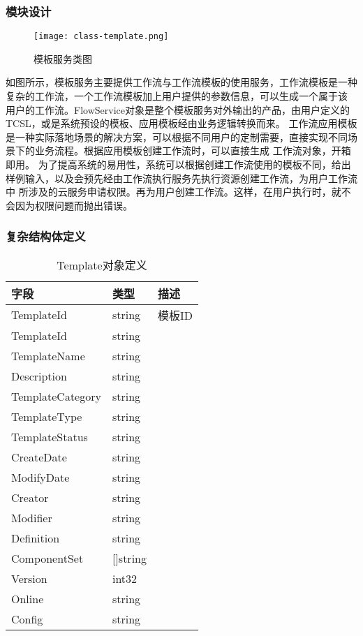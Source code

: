 \subsubsection{模块设计}



\begin{figure}[H]
    \centering
    \texttt{[image: class-template.png]}
    \caption{模板服务类图}
    \label{fig:模板服务类图}
\end{figure}
如图所示，模板服务主要提供工作流与工作流模板的使用服务，工作流模板是一种复杂的工作流，一个工作流模板加上用户提供的参数信息，可以生成一个属于该
用户的工作流。FlowService对象是整个模板服务对外输出的产品，由用户定义的TCSL，或是系统预设的模板、应用模板经由业务逻辑转换而来。
工作流应用模板是一种实际落地场景的解决方案，可以根据不同用户的定制需要，直接实现不同场景下的业务流程。根据应用模板创建工作流时，可以直接生成
工作流对象，开箱即用。
为了提高系统的易用性，系统可以根据创建工作流使用的模板不同，给出样例输入，以及会预先经由工作流执行服务先执行资源创建工作流，为用户工作流中
所涉及的云服务申请权限。再为用户创建工作流。这样，在用户执行时，就不会因为权限问题而抛出错误。




\subsubsection{复杂结构体定义}

\begin{table}[H]
    \centering
    \caption{Template对象定义}
    \label{tab:strcut-template}
    \begin{tabular}{lll}
        \toprule
        字段 & 类型 & 描述 \\
        \midrule
        TemplateId & string & 模板ID \\
        TemplateId &          string& \\
        TemplateName &        string& \\
        Description   &       string& \\
        TemplateCategory  &   string& \\
        TemplateType     &    string& \\
        TemplateStatus    &   string& \\
        CreateDate        &   string& \\
        ModifyDate        &   string& \\
        Creator           &   string& \\
        Modifier          &   string& \\
        Definition        &   string& \\
        ComponentSet      &   []string& \\
        Version           &   int32& \\
        Online            &   string& \\
        Config            &   string& \\
        \bottomrule
    \end{tabular}
\end{table}


